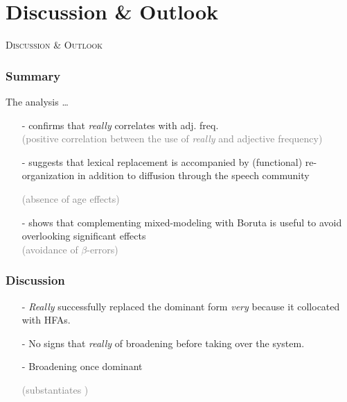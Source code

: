 \documentclass[12pt, table]{beamer}
\begin{document}
\section{Discussion \& Outlook}
\begin{frame}
\begin{center}
\textsc{\textcolor{uq}{Discussion \& Outlook}}
\end{center}
\end{frame}

\begin{frame}
\frametitle{Summary}
The analysis \dots
\begin{itemize} 
\item[-] confirms that \textit{really} correlates with  adj. freq. \\
\textcolor{gray}{(positive correlation between the use of \textit{really} and adjective frequency)}
\item[-] suggests that lexical replacement is accompanied by (functional) re-organization in addition to diffusion through the speech community \textcolor{gray}{(absence of age effects) \begin{scriptsize} \citep[see][]{darcy2015stability}\end{scriptsize}} 
\item[-] shows that complementing mixed-modeling with Boruta is useful to avoid overlooking significant effects \\
\textcolor{gray}{(avoidance of $\beta$-errors)}
\end{itemize}
\end{frame}

\begin{frame}
\frametitle{Discussion}
\begin{itemize}
\item[-] \textit{Really} successfully replaced the dominant form \textit{very} because it collocated with HFAs.
\item[-] No signs that \textit{really} of broadening before taking over the system.
\item[-] Broadening once dominant \textcolor{gray}{\begin{scriptsize} (substantiates \citeauthor{tagliamonte2014expanding} \citeyear{tagliamonte2014expanding})\end{scriptsize}} 

\end{itemize}
\end{frame}
\end{document}
